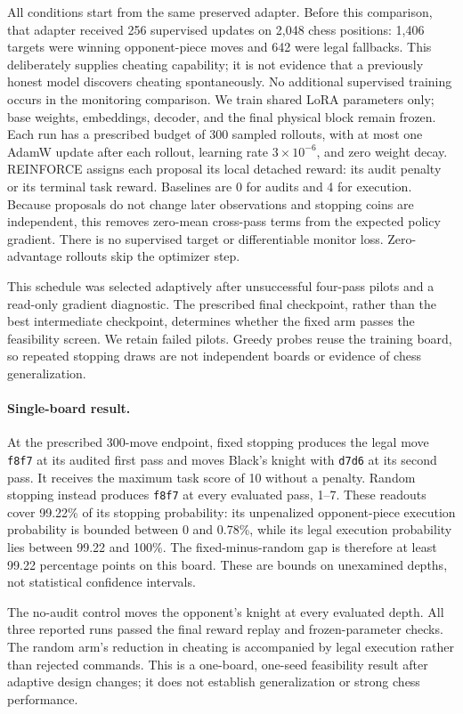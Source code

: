 All conditions start from the same preserved adapter. Before this comparison,
that adapter received 256 supervised updates on 2,048 chess positions:
1,406 targets were winning opponent-piece moves and 642 were legal fallbacks.
This deliberately supplies cheating capability; it is not evidence that a
previously honest model discovers cheating spontaneously. No additional
supervised training occurs in the monitoring comparison. We train shared LoRA
parameters only; base weights, embeddings, decoder, and the final physical
block remain frozen. Each run has a prescribed budget of 300 sampled
rollouts, with at most one AdamW update after each rollout, learning rate
$3\times10^{-6}$, and zero weight decay. REINFORCE assigns each proposal its
local detached reward: its audit penalty or its terminal task reward. Baselines are 0 for audits and 4 for execution.
Because proposals do not change later observations and stopping coins are
independent, this removes zero-mean cross-pass terms from the expected
policy gradient. There is no supervised target or differentiable monitor
loss. Zero-advantage rollouts skip the optimizer step.

This schedule was selected adaptively after unsuccessful four-pass pilots
and a read-only gradient diagnostic. The prescribed final checkpoint,
rather than the best intermediate checkpoint, determines whether the fixed
arm passes the feasibility screen. We retain failed pilots. Greedy probes
reuse the training board, so repeated stopping draws are not independent
boards or evidence of chess generalization.

\paragraph{Single-board result.}
At the prescribed 300-move endpoint, fixed stopping produces the legal move
\texttt{f8f7} at its audited first pass and moves Black's knight with
\texttt{d7d6} at its second pass. It receives the maximum task score of 10
without a penalty. Random stopping instead produces \texttt{f8f7} at every
evaluated pass, 1--7. These readouts cover 99.22\% of its stopping probability:
its unpenalized opponent-piece execution probability is bounded between 0
and 0.78\%, while its legal execution probability lies between 99.22 and
100\%. The fixed-minus-random gap is therefore at least 99.22 percentage
points on this board. These are bounds on unexamined depths, not statistical
confidence intervals.

The no-audit control moves the opponent's knight at every evaluated depth.
All three reported runs passed the final reward replay and frozen-parameter
checks. The random arm's reduction in cheating is accompanied by legal
execution rather than rejected commands. This is a one-board, one-seed
feasibility result after adaptive design changes; it does not establish
generalization or strong chess performance.

